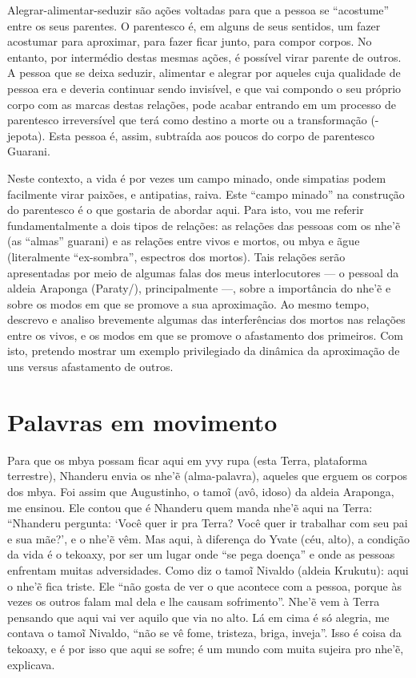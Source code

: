 Alegrar-alimentar-seduzir são ações voltadas para que a pessoa se
``acostume'' entre os seus parentes. O parentesco é, em alguns de seus
sentidos, um fazer acostumar para aproximar, para fazer ficar junto,
para compor corpos. No entanto, por intermédio destas mesmas ações, é
possível virar parente de outros. A pessoa que se deixa seduzir,
alimentar e alegrar por aqueles cuja qualidade de pessoa era e deveria
continuar sendo invisível, e que vai compondo o seu próprio corpo com
as marcas destas relações, pode acabar entrando em um processo de
parentesco irreversível que terá como destino a morte ou a
transformação (-jepota). Esta pessoa é, assim, subtraída aos poucos do
corpo de parentesco Guarani.

Neste contexto, a vida é por vezes um campo minado, onde simpatias podem
facilmente virar paixões, e antipatias, raiva. Este ``campo minado'' na
construção do parentesco é o que gostaria de abordar aqui. Para isto,
vou me referir fundamentalmente a dois tipos de relações: as relações
das pessoas com os nhe’\~{e} (as ``almas'' guarani) e as relações entre
vivos e mortos, ou mbya e ãgue (literalmente ``ex-sombra'', espectros dos
mortos). Tais relações serão apresentadas por meio de algumas falas dos
meus interlocutores --- o pessoal da aldeia Araponga (Paraty/),
principalmente ---, sobre a importância do nhe’\~{e} e sobre os modos
em que se promove a sua aproximação. Ao mesmo tempo, descrevo e analiso
brevemente algumas das interferências dos mortos nas relações entre os
vivos, e os modos em que se promove o afastamento dos primeiros. Com
isto, pretendo mostrar um exemplo privilegiado da dinâmica da
aproximação de uns versus afastamento de outros.

\section{Palavras em movimento}

Para que os mbya possam ficar aqui em yvy rupa (esta Terra, plataforma
terrestre), Nhanderu envia os nhe’\~{e} (alma-palavra), aqueles que
erguem os corpos dos mbya. Foi assim que Augustinho, o tamo\~{i} (avô,
idoso) da aldeia Araponga, me ensinou. Ele contou que é Nhanderu quem
manda nhe’\~{e} aqui na Terra: ``Nhanderu pergunta: ‘Você quer ir pra
Terra? Você quer ir trabalhar com seu pai e sua mãe?’, e o nhe’\~{e}
vêm. Mas aqui, à diferença do Yvate (céu, alto), a condição da vida é o
tekoaxy, por ser um lugar onde ``se pega doença'' e onde as pessoas
enfrentam muitas adversidades. Como diz o tamo\~{i} Nivaldo (aldeia
Krukutu): aqui o nhe’\~{e} fica triste. Ele ``não gosta de ver o que
acontece com a pessoa, porque às vezes os outros falam mal dela e lhe
causam sofrimento''. Nhe’\~{e} vem à Terra pensando que aqui vai ver
aquilo que via no alto. Lá em cima é só
alegria, me contava o tamo\~{i} Nivaldo, ``não se vê
fome, tristeza, briga, inveja''. Isso é coisa da tekoaxy, e é por isso
que aqui se sofre; é um mundo com muita sujeira pro
nhe’\~{e}, explicava. 

